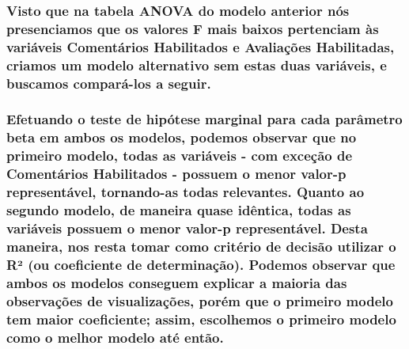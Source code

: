 \documentclass[]{article}
\begin{document}
\hypertarget{visto-que-na-tabela-anova-do-modelo-anterior-nos-presenciamos-que-os-valores-f-mais-baixos-pertenciam-as-variaveis-comentarios-habilitados-e-avaliacoes-habilitadas-criamos-um-modelo-alternativo-sem-estas-duas-variaveis-e-buscamos-compara-los-a-seguir.}{%
\subsubsection{Visto que na tabela ANOVA do modelo anterior nós
presenciamos que os valores F mais baixos pertenciam às variáveis
Comentários Habilitados e Avaliações Habilitadas, criamos um modelo
alternativo sem estas duas variáveis, e buscamos compará-los a
seguir.}\label{visto-que-na-tabela-anova-do-modelo-anterior-nos-presenciamos-que-os-valores-f-mais-baixos-pertenciam-as-variaveis-comentarios-habilitados-e-avaliacoes-habilitadas-criamos-um-modelo-alternativo-sem-estas-duas-variaveis-e-buscamos-compara-los-a-seguir.}}

\hypertarget{efetuando-o-teste-de-hipotese-marginal-para-cada-parametro-beta-em-ambos-os-modelos-podemos-observar-que-no-primeiro-modelo-todas-as-variaveis---com-excecao-de-comentarios-habilitados---possuem-o-menor-valor-p-representavel-tornando-as-todas-relevantes.-quanto-ao-segundo-modelo-de-maneira-quase-identica-todas-as-variaveis-possuem-o-menor-valor-p-representavel.-desta-maneira-nos-resta-tomar-como-criterio-de-decisao-utilizar-o-r-ou-coeficiente-de-determinacao.-podemos-observar-que-ambos-os-modelos-conseguem-explicar-a-maioria-das-observacoes-de-visualizacoes-porem-que-o-primeiro-modelo-tem-maior-coeficiente-assim-escolhemos-o-primeiro-modelo-como-o-melhor-modelo-ate-entao.}{%
\subsubsection{Efetuando o teste de hipótese marginal para cada
parâmetro beta em ambos os modelos, podemos observar que no primeiro
modelo, todas as variáveis - com exceção de Comentários Habilitados -
possuem o menor valor-p representável, tornando-as todas relevantes.
Quanto ao segundo modelo, de maneira quase idêntica, todas as variáveis
possuem o menor valor-p representável. Desta maneira, nos resta tomar
como critério de decisão utilizar o R² (ou coeficiente de determinação).
Podemos observar que ambos os modelos conseguem explicar a maioria das
observações de visualizações, porém que o primeiro modelo tem maior
coeficiente; assim, escolhemos o primeiro modelo como o melhor modelo
até
então.}\label{efetuando-o-teste-de-hipotese-marginal-para-cada-parametro-beta-em-ambos-os-modelos-podemos-observar-que-no-primeiro-modelo-todas-as-variaveis---com-excecao-de-comentarios-habilitados---possuem-o-menor-valor-p-representavel-tornando-as-todas-relevantes.-quanto-ao-segundo-modelo-de-maneira-quase-identica-todas-as-variaveis-possuem-o-menor-valor-p-representavel.-desta-maneira-nos-resta-tomar-como-criterio-de-decisao-utilizar-o-r-ou-coeficiente-de-determinacao.-podemos-observar-que-ambos-os-modelos-conseguem-explicar-a-maioria-das-observacoes-de-visualizacoes-porem-que-o-primeiro-modelo-tem-maior-coeficiente-assim-escolhemos-o-primeiro-modelo-como-o-melhor-modelo-ate-entao.}}
\end{document}
